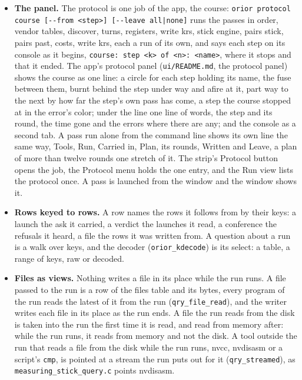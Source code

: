 \begin{itemize}
\item \textbf{The panel.} The protocol is one job of the app, the course: \texttt{orior protocol course [-\allowbreak{}-\allowbreak{}from <step>] [-\allowbreak{}-\allowbreak{}leave all|none]} runs the passes in order, vendor tables, discover, turns, registers, write krs, stick engine, pairs stick, pairs past, costs, write krs, each a run of its own, and says each step on its console as it begins, \texttt{course: step <k> of <n>: <name>}, where it stops and that it ended. The app's protocol panel (\texttt{ui/\allowbreak{}README.\allowbreak{}md}, the protocol panel) shows the course as one line: a circle for each step holding its name, the fuse between them, burnt behind the step under way and afire at it, part way to the next by how far the step's own pass has come, a step the course stopped at in the error's color; under the line one line of words, the step and its round, the time gone and the errors where there are any; and the console as a second tab. A pass run alone from the command line shows its own line the same way, Tools, Run, Carried in, Plan, its rounds, Written and Leave, a plan of more than twelve rounds one stretch of it. The strip's Protocol button opens the job, the Protocol menu holds the one entry, and the Run view lists the protocol once. A pass is launched from the window and the window shows it.
\item \textbf{Rows keyed to rows.} A row names the rows it follows from by their keys: a launch the ask it carried, a verdict the launches it read, a conference the refusals it heard, a file the rows it was written from. A question about a run is a walk over keys, and the decoder (\texttt{orior\_\allowbreak{}kdecode}) is its select: a table, a range of keys, raw or decoded.
\item \textbf{Files as views.} Nothing writes a file in its place while the run runs. A file passed to the run is a row of the files table and its bytes, every program of the run reads the latest of it from the run (\texttt{qry\_\allowbreak{}file\_\allowbreak{}read}), and the writer writes each file in its place as the run ends. A file the run reads from the disk is taken into the run the first time it is read, and read from memory after: while the run runs, it reads from memory and not the disk. A tool outside the run that reads a file from the disk while the run runs, nvcc, nvdisasm or a script's \texttt{cmp}, is pointed at a stream the run puts out for it (\texttt{qry\_\allowbreak{}streamed}), as \texttt{measuring\_\allowbreak{}stick\_\allowbreak{}query.\allowbreak{}c} points nvdisasm.
\end{itemize}

